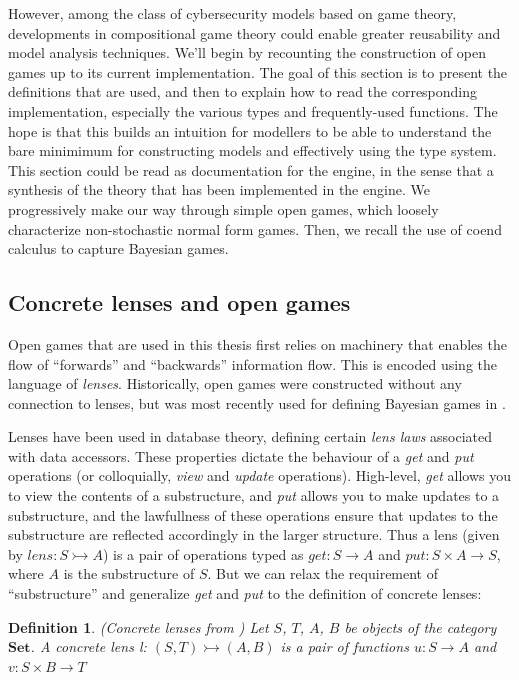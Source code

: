 \documentclass[11pt,titlepage,dvipsnames,table,xcdraw,english]{article}
\newcommand{\Set}{\mathbf{Set}}
\newtheorem{definition}{Definition}[section]
\begin{document}
However, among the class of cybersecurity models based on game theory, developments in compositional game theory could enable greater reusability and model analysis techniques. We'll begin by recounting the construction of open games up to its current implementation. The goal of this section is to present the definitions that are used, and then to explain 
how to read the corresponding implementation, especially the various types and frequently-used functions. The hope is 
that this builds an intuition for modellers to be able to understand the bare minimimum for constructing 
models and effectively using the type system. This section could be read as documentation for the engine, in the sense that a synthesis of the theory that has been implemented in the engine. We progressively make our way through simple open games, which loosely characterize non-stochastic normal form games. Then, we recall the use of coend calculus to capture Bayesian games.

\subsection{Concrete lenses and open games}
Open games that are used in this thesis first relies on machinery that enables the flow of ``forwards'' and ``backwards'' 
information flow. This is encoded using the language of 
\textit{lenses}. Historically, open games were constructed without any connection to 
lenses, but was most recently used for defining Bayesian games in \cite{BayesianOpenGames}. 

Lenses have been used in database theory, defining certain 
\textit{lens laws} associated with data accessors. These properties dictate the behaviour 
of a \textit{get} and \textit{put} operations (or colloquially, \textit{view} and \textit{update} operations).
High-level, \textit{get} allows you to view the contents of a substructure, and 
\textit{put} allows you to make updates to a substructure, and the lawfullness of these operations ensure that 
updates to the substructure are reflected accordingly in the larger structure. Thus a lens (given by $lens: S \rightarrowtail A$) is a pair of operations typed as $get: S \rightarrow A$
and $put: S \times A \rightarrow S$, where $A$ is the substructure of $S$. But we can relax the requirement of ``substructure''
and generalize \textit{get} and \textit{put} to the definition of concrete lenses:

\begin{definition}(Concrete lenses from \cite[Definition 2.2.1]{BayesianOpenGames}) Let $S$, $T$, $A$, $B$ be objects of 
the category $\Set$. A \textit{concrete lens} l: $(S,T) \rightarrowtail (A,B)$ is a pair of functions 
$u: S \rightarrow A$ and $v: S \times B \rightarrow T$
\end{definition}
\end{document}
